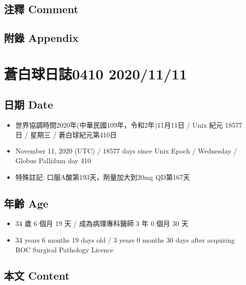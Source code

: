 \documentclass[
]{article}
\providecommand{\tightlist}{%
  \setlength{\itemsep}{0pt}\setlength{\parskip}{0pt}}
\begin{document}
\hypertarget{ux6ce8ux91cb-comment-65}{%
\subsection{注釋 Comment}\label{ux6ce8ux91cb-comment-65}}

\hypertarget{ux9644ux9304-appendix-65}{%
\subsection{附錄 Appendix}\label{ux9644ux9304-appendix-65}}

\hypertarget{ux84bcux767dux7403ux65e5ux8a8c0410-20201111}{%
\section{蒼白球日誌0410
2020/11/11}\label{ux84bcux767dux7403ux65e5ux8a8c0410-20201111}}

\hypertarget{ux65e5ux671f-date-66}{%
\subsection{日期 Date}\label{ux65e5ux671f-date-66}}

\begin{itemize}
\tightlist
\item
  世界協調時間2020年(中華民國109年，令和2年)11月11日 / Unix 紀元 18577
  日 / 星期三 / 蒼白球紀元第410日
\item
  November 11, 2020 (UTC) / 18577 days since Unix Epoch / Wednesday /
  Globus Pallidum day 410
\item
  特殊註記: 口服A酸第193天，劑量加大到20mg QD第167天
\end{itemize}

\hypertarget{ux5e74ux9f61-age-66}{%
\subsection{年齡 Age}\label{ux5e74ux9f61-age-66}}

\begin{itemize}
\tightlist
\item
  34 歲 6 個月 19 天 / 成為病理專科醫師 3 年 0 個月 30 天
\item
  34 years 6 months 19 days old / 3 years 0 months 30 days after
  acquiring ROC Surgical Pathology Licence
\end{itemize}

\hypertarget{ux672cux6587-content-66}{%
\subsection{本文 Content}\label{ux672cux6587-content-66}}
\end{document}
